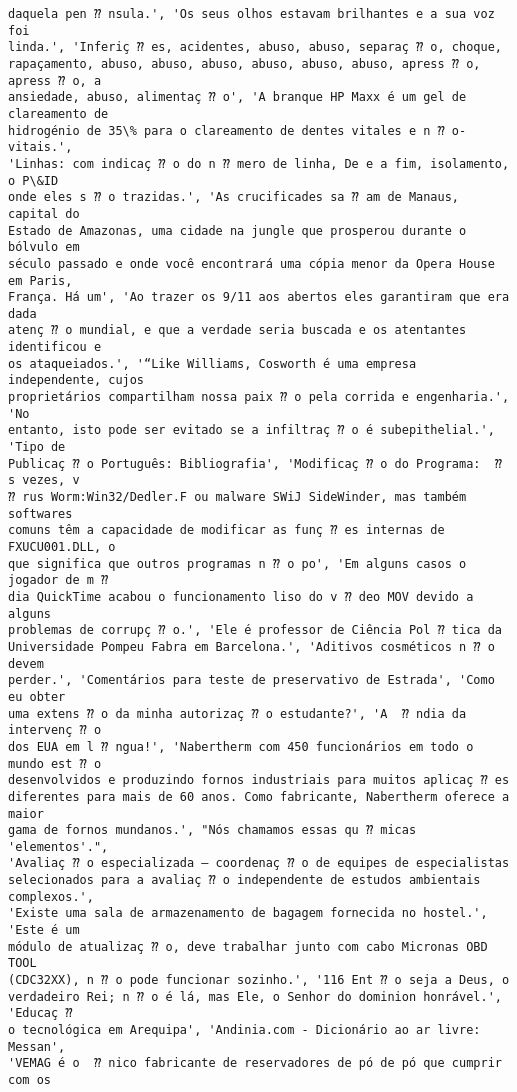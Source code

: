 \documentclass[10pt]{article}
\begin{document}
\begin{Verbatim}[commandchars=\\\{\}]
daquela pen ⁇ nsula.', 'Os seus olhos estavam brilhantes e a sua voz foi
linda.', 'Inferiç ⁇ es, acidentes, abuso, abuso, separaç ⁇ o, choque,
rapaçamento, abuso, abuso, abuso, abuso, abuso, abuso, apress ⁇ o, apress ⁇ o, a
ansiedade, abuso, alimentaç ⁇ o', 'A branque HP Maxx é um gel de clareamento de
hidrogénio de 35\% para o clareamento de dentes vitales e n ⁇ o-vitais.',
'Linhas: com indicaç ⁇ o do n ⁇ mero de linha, De e a fim, isolamento, o P\&ID
onde eles s ⁇ o trazidas.', 'As crucificades sa ⁇ am de Manaus, capital do
Estado de Amazonas, uma cidade na jungle que prosperou durante o bólvulo em
século passado e onde você encontrará uma cópia menor da Opera House em Paris,
França. Há um', 'Ao trazer os 9/11 aos abertos eles garantiram que era dada
atenç ⁇ o mundial, e que a verdade seria buscada e os atentantes identificou e
os ataqueiados.', '“Like Williams, Cosworth é uma empresa independente, cujos
proprietários compartilham nossa paix ⁇ o pela corrida e engenharia.', 'No
entanto, isto pode ser evitado se a infiltraç ⁇ o é subepithelial.', 'Tipo de
Publicaç ⁇ o Português: Bibliografia', 'Modificaç ⁇ o do Programa:  ⁇ s vezes, v
⁇ rus Worm:Win32/Dedler.F ou malware SWiJ SideWinder, mas também softwares
comuns têm a capacidade de modificar as funç ⁇ es internas de FXUCU001.DLL, o
que significa que outros programas n ⁇ o po', 'Em alguns casos o jogador de m ⁇
dia QuickTime acabou o funcionamento liso do v ⁇ deo MOV devido a alguns
problemas de corrupç ⁇ o.', 'Ele é professor de Ciência Pol ⁇ tica da
Universidade Pompeu Fabra em Barcelona.', 'Aditivos cosméticos n ⁇ o devem
perder.', 'Comentários para teste de preservativo de Estrada', 'Como eu obter
uma extens ⁇ o da minha autorizaç ⁇ o estudante?', 'A  ⁇ ndia da intervenç ⁇ o
dos EUA em l ⁇ ngua!', 'Nabertherm com 450 funcionários em todo o mundo est ⁇ o
desenvolvidos e produzindo fornos industriais para muitos aplicaç ⁇ es
diferentes para mais de 60 anos. Como fabricante, Nabertherm oferece a maior
gama de fornos mundanos.', "Nós chamamos essas qu ⁇ micas 'elementos'.",
'Avaliaç ⁇ o especializada – coordenaç ⁇ o de equipes de especialistas
selecionados para a avaliaç ⁇ o independente de estudos ambientais complexos.',
'Existe uma sala de armazenamento de bagagem fornecida no hostel.', 'Este é um
módulo de atualizaç ⁇ o, deve trabalhar junto com cabo Micronas OBD TOOL
(CDC32XX), n ⁇ o pode funcionar sozinho.', '116 Ent ⁇ o seja a Deus, o
verdadeiro Rei; n ⁇ o é lá, mas Ele, o Senhor do dominion honrável.', 'Educaç ⁇
o tecnológica em Arequipa', 'Andinia.com - Dicionário ao ar livre: Messan',
'VEMAG é o  ⁇ nico fabricante de reservadores de pó de pó que cumprir com os

\end{Verbatim}
\end{document}
